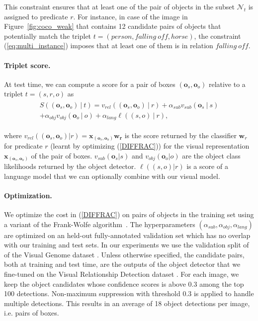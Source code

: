 \documentclass[10pt,twocolumn,letterpaper]{article}
\newcommand{\spaceparagraph}{\vspace{-.35cm}}
\begin{document}
This constraint ensures that at least one of the pair of objects in the subset $\mathcal{N}_t$ is assigned to predicate $r$. For instance, in case of the image in Figure~\ref{fig:coco_weak} that contains 12 candidate pairs of objects that potentially match the triplet $t=(person,falling~off,horse)$, the constraint (\ref{eq:multi_instance}) imposes that at least one of them is in relation $falling ~off$. 


\spaceparagraph
\paragraph{Triplet score.} 
At test time, we can compute a score for a pair of boxes $(\bm{o}_s,\bm{o}_o)$ relative to a triplet $t=(s,r,o)$ as
\begin{align}
\label{eq:score}
\begin{split}
S((\bm{o}_s,\bm{o}_o) ~|~ t) = v_{rel}((\bm{o}_s,\bm{o}_o) ~|~ r) + \alpha_{sub} v_{sub}(\bm{o}_s ~|~ s) \\ + \alpha_{obj} v_{obj}(\bm{o}_o ~|~ o) + \alpha_{lang} \ell((s,o) ~|~ r),
\end{split}
\end{align}
\vspace{-0.4cm}

\noindent where $v_{rel}((\bm{o}_s,\bm{o}_o) | r) = \mathbf{x}_{(\bm{o}_s,\bm{o}_o)} \mathbf{w_r}$
is the score returned by the classifier $\mathbf{w}_r$ for predicate $r$ (learnt by optimizing (\ref{DIFFRAC})) for the visual representation $\mathbf{x}_{(\bm{o}_s,\bm{o}_o)}$ of the pair of boxes. $v_{sub}(\bm{o}_s | s)$ and $v_{obj}(\bm{o}_o | o)$ are the object class likelihoods returned by the object detector. $\ell((s,o) | r)$ is a score of a language model that we can optionally combine with our visual model. 

\spaceparagraph
\paragraph{Optimization.} We optimize the cost in (\ref{DIFFRAC}) on pairs of objects in the training set using a variant of the Frank-Wolfe algorithm~\cite{miech17,Osokin16}. The hyperparameters $(\alpha_{sub}, \alpha_{obj}, \alpha_{lang})$ are optimized on an held-out fully-annotated validation set which has no overlap with our training and test sets. In our experiments we use the validation split of \cite{Johnson2015} of the Visual Genome dataset \cite{Krishna2016}. Unless otherwise specified, the candidate pairs, both at training and test time, are the outputs of the object detector \cite{girshick15fastrcnn} that we fine-tuned on the Visual Relationship Detection dataset \cite{Lu16}. For each image, we keep the object candidates whose confidence scores is above 0.3 among the top 100 detections. Non-maximum suppression with threshold 0.3 is applied to handle multiple detections. This results in an average of 18 object detections per image, i.e. pairs of boxes.
\end{document}

